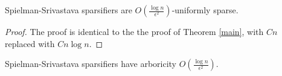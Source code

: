 \begin{theorem} 
Spielman-Srivastava sparsifiers are $O\left(\frac{\log n}{\epsilon^2}\right)$-uniformly sparse.
\end{theorem}
\begin{proof}
The proof is identical to the the proof of Theorem \ref{main}, with $Cn$ replaced with $Cn\log n$.
\end{proof}
\begin{corollary}
Spielman-Srivastava sparsifiers have arboricity $O(\frac{\log n}{\epsilon^2})$.
\end{corollary}

